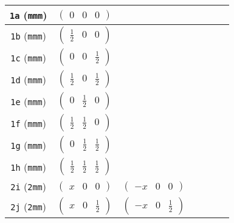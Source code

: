\documentclass[fleqn,9pt,landscape]{jsarticle}
\begin{document}
\begin{center}
\begin{longtable}{ccccccc}
{\tt 1a} ({\tt mmm}) & $ \begin{pmatrix} 0 & 0 & 0 \end{pmatrix} $ & $  $ & $  $ & $  $ & $  $ & $  $ \\ \hline
{\tt 1b} ({\tt mmm}) & $ \begin{pmatrix} \frac{1}{2} & 0 & 0 \end{pmatrix} $ & $  $ & $  $ & $  $ & $  $ & $  $ \\ \hline
{\tt 1c} ({\tt mmm}) & $ \begin{pmatrix} 0 & 0 & \frac{1}{2} \end{pmatrix} $ & $  $ & $  $ & $  $ & $  $ & $  $ \\ \hline
{\tt 1d} ({\tt mmm}) & $ \begin{pmatrix} \frac{1}{2} & 0 & \frac{1}{2} \end{pmatrix} $ & $  $ & $  $ & $  $ & $  $ & $  $ \\ \hline
{\tt 1e} ({\tt mmm}) & $ \begin{pmatrix} 0 & \frac{1}{2} & 0 \end{pmatrix} $ & $  $ & $  $ & $  $ & $  $ & $  $ \\ \hline
{\tt 1f} ({\tt mmm}) & $ \begin{pmatrix} \frac{1}{2} & \frac{1}{2} & 0 \end{pmatrix} $ & $  $ & $  $ & $  $ & $  $ & $  $ \\ \hline
{\tt 1g} ({\tt mmm}) & $ \begin{pmatrix} 0 & \frac{1}{2} & \frac{1}{2} \end{pmatrix} $ & $  $ & $  $ & $  $ & $  $ & $  $ \\ \hline
{\tt 1h} ({\tt mmm}) & $ \begin{pmatrix} \frac{1}{2} & \frac{1}{2} & \frac{1}{2} \end{pmatrix} $ & $  $ & $  $ & $  $ & $  $ & $  $ \\ \hline
{\tt 2i} ({\tt 2mm}) & $ \begin{pmatrix} x & 0 & 0 \end{pmatrix} $ & $ \begin{pmatrix} - x & 0 & 0 \end{pmatrix} $ & $  $ & $  $ & $  $ & $  $ \\ \hline
{\tt 2j} ({\tt 2mm}) & $ \begin{pmatrix} x & 0 & \frac{1}{2} \end{pmatrix} $ & $ \begin{pmatrix} - x & 0 & \frac{1}{2} \end{pmatrix} $ & $  $ & $  $ & $  $ & $  $ \\ \hline

\end{longtable}
\end{center}
\end{document}
